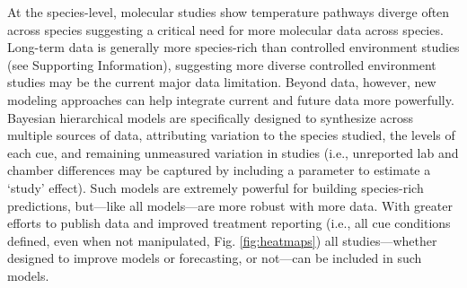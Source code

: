 \documentclass[11pt,letter]{article}
\newcommand{\R}[1]{\label{#1}\linelabel{#1}}
\begin{document}
At the species-level, molecular studies show temperature pathways diverge often across species \citep[in contrast, photoperiodic control appears highly conserved,][]{Satake2022} suggesting a critical need for more molecular data across species.\R{r2popsend} Long-term data is generally more species-rich than controlled environment studies (see Supporting Information), suggesting more diverse controlled environment studies may be the current major data limitation. Beyond data, however, new modeling approaches can help integrate current and future data more powerfully. \\

Bayesian hierarchical models are specifically designed to synthesize across multiple sources of data, attributing variation to the species studied, the levels of each cue, and remaining unmeasured variation in studies (i.e., unreported lab and chamber differences may be captured by including a parameter to estimate a `study' effect). Such models are extremely powerful for building species-rich predictions, but---like all models---are more robust with more data. With greater efforts to publish data and improved treatment reporting (i.e., all cue conditions defined, even when not manipulated, Fig. \ref{fig:heatmaps}) all studies---whether designed to improve models or forecasting, or not---can be included in such models. 


\end{document}
